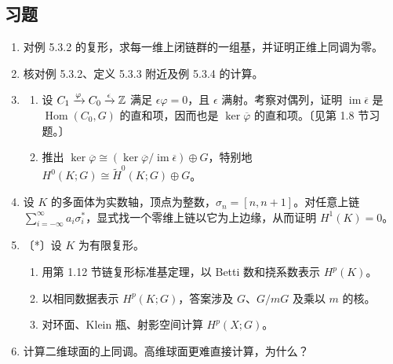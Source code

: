\subsection*{习题}
\begin{enumerate}
\item 对例 5.3.2 的复形，求每一维上闭链群的一组基，并证明正维上同调为零。
\item 核对例 5.3.2、定义 5.3.3 附近及例 5.3.4 的计算。
\item \begin{enumerate}[label=(\alph*)]
\item 设 $C_1\xrightarrow{\varphi}C_0\xrightarrow{\epsilon}\mathbb{Z}$ 满足 $\epsilon\varphi=0$，且 $\epsilon$ 满射。考察对偶列，证明 $\operatorname{im}\overline\epsilon$ 是 $\operatorname{Hom}(C_0,G)$ 的直和项，因而也是 $\ker\overline\varphi$ 的直和项。〔见第 1.8 节习题。〕
\item 推出 $\ker\overline\varphi\cong(\ker\overline\varphi/\operatorname{im}\overline\epsilon)\oplus G$，特别地 $H^0(K;G)\cong\widetilde H^0(K;G)\oplus G$。
\end{enumerate}
\item 设 $K$ 的多面体为实数轴，顶点为整数，$\sigma_n=[n,n+1]$。对任意上链 $\sum_{i=-\infty}^{\infty}a_i\sigma_i^*$，显式找一个零维上链以它为上边缘，从而证明 $H^1(K)=0$。
\item 〔*〕设 $K$ 为有限复形。
\begin{enumerate}[label=(\alph*)]
\item 用第 1.12 节链复形标准基定理，以 Betti 数和挠系数表示 $H^p(K)$。
\item 以相同数据表示 $H^p(K;G)$，答案涉及 $G$、$G/mG$ 及乘以 $m$ 的核。
\item 对环面、Klein 瓶、射影空间计算 $H^p(X;G)$。
\end{enumerate}
\item 计算二维球面的上同调。高维球面更难直接计算，为什么？
\end{enumerate}
